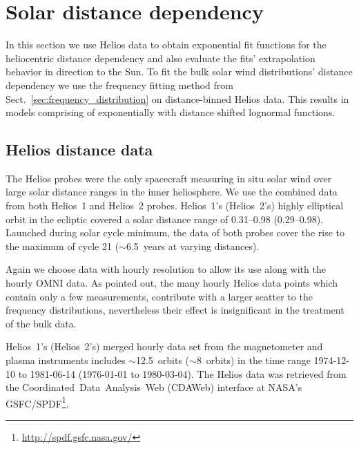 \section{Solar distance dependency}
\label{sec:solar_distance_dependency}
In this section we use Helios data to obtain exponential fit functions for the heliocentric distance dependency and also evaluate the fits' extrapolation behavior in direction to the Sun. To fit the bulk solar wind distributions' distance dependency we use the frequency fitting method from Sect.~\ref{sec:frequency_distribution} on distance-binned Helios data. This results in models comprising of exponentially with distance shifted lognormal functions.

\subsection{Helios distance data}
\label{sec:helios_distance_data}
The Helios probes were the only spacecraft measuring in situ solar wind over large solar distance ranges in the inner heliosphere. We use the combined data from both Helios~1 and Helios~2 probes. Helios~1's (Helios~2's) highly elliptical orbit in the ecliptic covered a solar distance range of \SIrange{0.31}{0.98}{\au} (\SIrange{0.29}{0.98}{\au}). Launched during solar cycle minimum, the data of both probes cover the rise to the maximum of cycle 21 ($\sim$6.5~years at varying distances).

Again we choose data with hourly resolution to allow its use along with the hourly OMNI data. As \citet{Schwenn1983} pointed out, the many hourly Helios data points which contain only a few measurements, contribute with a larger scatter to the frequency distributions, nevertheless their effect is insignificant in the treatment of the bulk data.	%

Helios~1's (Helios~2's) merged hourly data set from the magnetometer and plasma instruments \citep{Rosenbauer1977} includes $\sim$12.5~orbits ($\sim$8~orbits) in the time range \mbox{1974-12-10} to \mbox{1981-06-14} (\mbox{1976-01-01} to \mbox{1980-03-04}).
The Helios data was retrieved from the Coordinated~Data~Analysis~Web (CDAWeb) interface at NASA's GSFC/SPDF\footnote{\url{http://spdf.gsfc.nasa.gov/}}.

